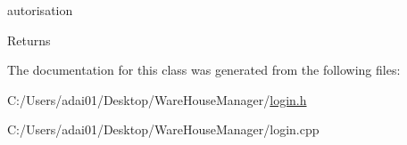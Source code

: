 autorisation 

\begin{DoxyReturn}{Returns}

\end{DoxyReturn}


The documentation for this class was generated from the following files\+:\begin{DoxyCompactItemize}
\item 
C\+:/\+Users/adai01/\+Desktop/\+Ware\+House\+Manager/\mbox{\hyperlink{login_8h}{login.\+h}}\item 
C\+:/\+Users/adai01/\+Desktop/\+Ware\+House\+Manager/login.\+cpp\end{DoxyCompactItemize}
